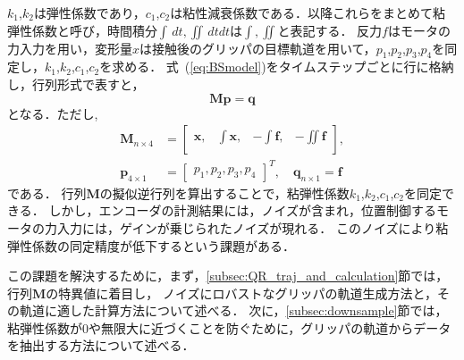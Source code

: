 \documentclass[a4paper]{jarticle}
\begin{document}
$k_1$,$k_2$は弾性係数であり，$c_1$,$c_2$は粘性減衰係数である．以降これらをまとめて粘弾性係数と呼び，時間積分$\int \,dt, \iint \,dtdt $は$\int, \iint$と表記する．
反力$f$はモータの力入力を用い，変形量$x$は接触後のグリッパの目標軌道を用いて，$p_1$,$p_2$,$p_3$,$p_4$を同定し，$k_1$,$k_2$,$c_1$,$c_2$を求める．
式~(\ref{eq:BSmodel})をタイムステップごとに行に格納し，行列形式で表すと，
\begin{equation}
    \mathbf{M}\mathbf{p} = \mathbf{q} 
    \label{eq:Mp_q}
\end{equation}
となる．ただし,
\begin{equation}
    \begin{aligned}
        \mathbf{M}_{n \times 4} &= \begin{bmatrix}
            \boldsymbol{x}, & \int{\boldsymbol{x}}, & -\int{\boldsymbol{f}}, & -\iint{\boldsymbol{f}}\\
        \end{bmatrix}, \\
        \mathbf{p}_{4 \times 1}  &= \begin{bmatrix}
            p_1 ,p_2 ,p_3 ,p_4
        \end{bmatrix}^{T}, \quad
        \mathbf{q}_{n \times 1}   = \boldsymbol{f}
    \end{aligned}
\label{eq:BSmodel_matrix}
\end{equation}
である．
行列$\mathbf{M}$の擬似逆行列を算出することで，粘弾性係数$k_1$,$k_2$,$c_1$,$c_2$を同定できる．
しかし，エンコーダの計測結果には，ノイズが含まれ，位置制御するモータの力入力には，ゲインが乗じられたノイズが現れる．
このノイズにより粘弾性係数の同定精度が低下するという課題がある．

この課題を解決するために，まず，\ref{subsec:QR_traj_and_calculation}節では，行列$\mathbf{M}$の特異値に着目し，
ノイズにロバストなグリッパの軌道生成方法と，その軌道に適した計算方法について述べる．
次に，\ref{subsec:downsample}節では，粘弾性係数が0や無限大に近づくことを防ぐために，グリッパの軌道からデータを抽出する方法について述べる．
\end{document}
